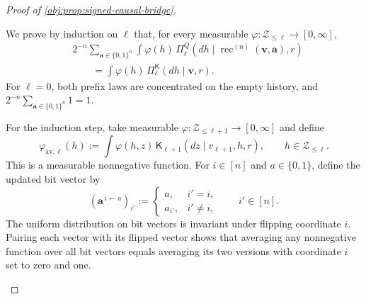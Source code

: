 \documentclass[11pt]{article}
\begin{document}
\begin{proof}[Proof of \cref{obj:prop:signed-causal-bridge}]
\begin{enumerate}
We prove by induction on \(\ell\) that, for every measurable
\(\varphi:\mathcal Z_{\le\ell}\to[0,\infty]\),
\[
\begin{aligned}
&2^{-n}\sum_{\mathbf a\in\{0,1\}^n}
 \int\varphi(h)\,
 \Pi_\ell^Q(dh\mid
 \operatorname{rec}^{(n)}(\mathbf v,\mathbf a),r)\\
&\qquad=\int\varphi(h)\,
 \Pi_\ell^{\mathsf K}(dh\mid\mathbf v,r).
\end{aligned}
\]
For \(\ell=0\), both prefix laws are concentrated on the empty history,
and \(2^{-n}\sum_{\mathbf a\in\{0,1\}^n}1=1\).

For the induction step, take measurable
\(\varphi:\mathcal Z_{\le\ell+1}\to[0,\infty]\) and define
\[
\varphi_{\mathrm{av},\ell}(h)
:=\int\varphi(h,z)\,
 \mathsf K_{\ell+1}(dz\mid v_{\ell+1},h,r),
\qquad h\in\mathcal Z_{\le\ell}.
\]
This is a measurable nonnegative function. For \(i\in[n]\) and
\(a\in\{0,1\}\), define the updated bit vector by
\[
(\mathbf a^{\,i\leftarrow a})_{i'}
:=
\begin{cases}
a,&i'=i,\\
a_{i'},&i'\ne i,
\end{cases}
\qquad i'\in[n].
\]
The uniform distribution on bit vectors is invariant under flipping
coordinate \(i\). Pairing each vector with its flipped vector shows that
averaging any nonnegative function over all bit vectors equals
averaging its two versions with coordinate \(i\) set to zero and one.


\end{enumerate}
\end{proof}
\end{document}
